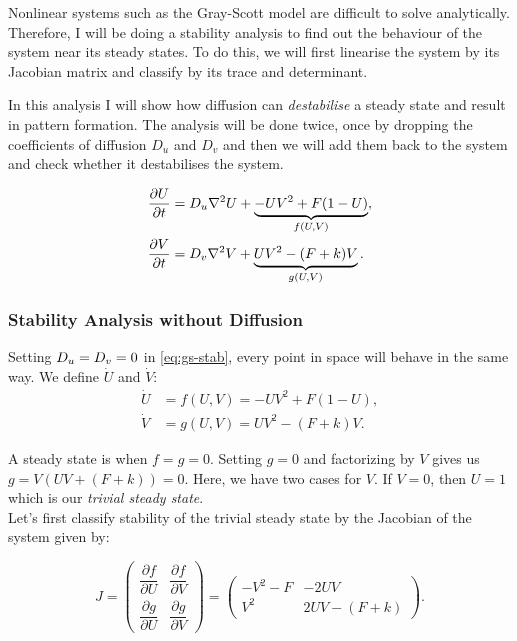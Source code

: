 \documentclass[a4paper, 11pt]{article}
\begin{document}
Nonlinear systems such as the Gray-Scott model are difficult to solve analytically. Therefore, I will be doing a stability analysis to find out the behaviour of the system near its steady states. To do this, we will first linearise the system by its Jacobian matrix and classify by its trace and determinant.


In this analysis I will show how diffusion can \emph{destabilise} a steady state and result in pattern formation. The analysis will be done twice, once by dropping the coefficients of diffusion $D_u$ and $D_v$ and then we will add them back to the system and check whether it destabilises the system.


\begin{equation}
	\label{eq:gs-stab}
	\begin{aligned}
		\frac{\partial U}{\partial t} & = D_u \nabla^2 U + \underbrace{-UV^2 + F(1 - U)}_{f(U,V)},   \\
		\frac{\partial V}{\partial t} & = D_v \nabla^2 V + \underbrace{UV^2 - (F + k)V}_{g(U,V)}.
	\end{aligned}
\end{equation}

\subsubsection*{Stability Analysis without Diffusion}

Setting $D_u = D_v = 0$ in \cref{eq:gs-stab}, every point in space will behave in the same way. We define $\dot{U}$ and $\dot{V}$:
\begin{equation}
	\label{eq:gs-nodiff}
	\begin{aligned}
		\dot{U} & = f(U, V) = -UV^2 + F(1 - U), \\
		\dot{V} & = g(U, V) = UV^2 - (F + k)V.
	\end{aligned}
\end{equation}


A steady state is when $f = g = 0$. Setting $g = 0$ and factorizing by $V$ gives us $g = V(UV + (F + k)) = 0$. Here, we have two cases for $V$. If $V  = 0$, then $U = 1$ which is our \emph{trivial steady state}.
\\
Let's first classify stability of  the trivial steady state by the Jacobian of the system given by:

\begin{equation}
	\label{eq:gs-jacobian}
	J =
	\begin{pmatrix}
		\dfrac{\partial f}{\partial U} & \dfrac{\partial f}{\partial V} \\[8pt]
		\dfrac{\partial g}{\partial U} & \dfrac{\partial g}{\partial V}
	\end{pmatrix}
	=
	\begin{pmatrix}
		-V^2 - F & -2UV          \\
		V^2      & 2UV - (F + k)
	\end{pmatrix}.
\end{equation}
\end{document}
